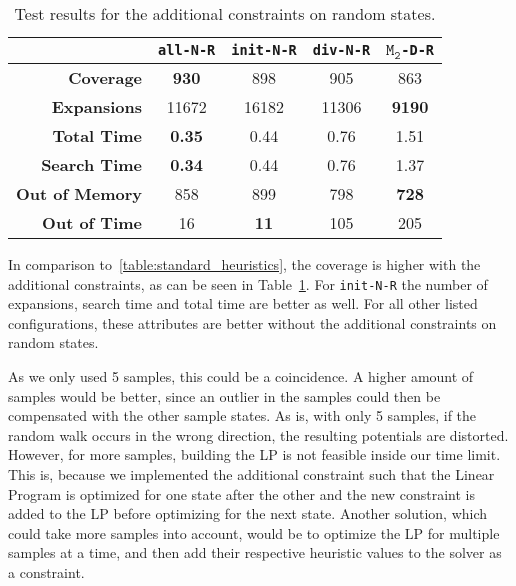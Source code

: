 \begin{table}[h!]
    \begin{center}
        \begin{tabular}{|r|c|c|c|c|}
            \hline
            & \textbf{\texttt{all-N-R}} & \textbf{\texttt{init-N-R}} &\textbf{\texttt{div-N-R}} & \textbf{$\texttt{M}_\texttt{2}$\texttt{-D-R}} \\
            \hline \hline
            \textbf{Coverage}       & \textbf{930}  & 898           & 905   & 863 \\ \hline
            \textbf{Expansions}     & 11672         & 16182         & 11306 & \textbf{9190} \\ \hline
            \textbf{Total Time}     & \textbf{0.35} & 0.44          & 0.76  & 1.51 \\ \hline
            \textbf{Search Time}    & \textbf{0.34} & 0.44          & 0.76  & 1.37 \\ \hline
            \textbf{Out of Memory}  & 858           & 899           & 798   & \textbf{728} \\ \hline
            \textbf{Out of Time}    & 16            & \textbf{11}   & 105   & 205 \\ \hline
        \end{tabular}
        \caption{Test results for the additional constraints on random states.}
        \label{table:random-samples-constraint}
    \end{center}
\end{table}

In comparison to~\autoref{table:standard_heuristics}, the coverage is higher with the additional constraints, as can be seen in Table~\ref{table:random-samples-constraint}.
For \texttt{init-N-R} the number of expansions, search time and total time are better as well.
For all other listed configurations, these attributes are better without the additional constraints on random states.

As we only used 5 samples, this could be a coincidence.
A higher amount of samples would be better, since an outlier in the samples could then be compensated with the other sample states.
As is, with only 5 samples, if the random walk occurs in the wrong direction, the resulting potentials are distorted.
However, for more samples, building the LP is not feasible inside our time limit.
This is, because we implemented the additional constraint such that the Linear Program is optimized for one state after the other and the new constraint is added to the LP before optimizing for the next state.
Another solution, which could take more samples into account, would be to optimize the LP for multiple samples at a time, and then add their respective heuristic values to the solver as a constraint.

